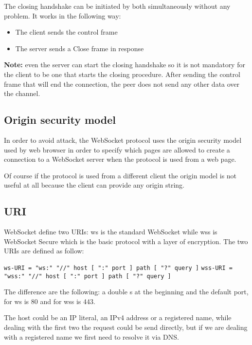 The closing handshake can be initiated by both simultaneously without any problem.\newline
It works in the following way:
\begin{itemize}
	\item The client sends the control frame
	\item The server sends a Close frame in response
\end{itemize}

\textbf{Note:} even the server can start the closing handshake so it is not mandatory for the client to be one that starts the closing procedure.\newline
After sending the control frame that will end the connection, the peer does not send any other data over the channel.

\subsection{Origin security model}
In order to avoid attack, the WebSocket protocol uses the origin security model used by web browser in order
to specify which pages are allowed to create a connection to a WebSocket server when the protocol is used from a web page.\newline

Of course if the protocol is used from a different client the origin model is not useful at all because the client can provide any origin string.

\subsection{URI}
WebSocket define two URIs: ws is the standard WebSocket while wss is WebSocket Secure which is the basic protocol with a layer of encryption.\newline
The two URIs are defined as follow:\newline

\texttt{ws-URI = "ws:" "//" host [ ":" port ] path [ "?" query ]}\newline
\texttt{wss-URI = "wss:" "//" host [ ":" port ] path [ "?" query ]}\newline

The difference are the following: a double s at the beginning and the default port, for ws is 80 and for wss is 443.\newline

The host could be an IP literal, an IPv4 address or a registered name, while dealing with the first two the request could be send directly, but if we are dealing with a registered name we first need to resolve it via DNS.\newline

